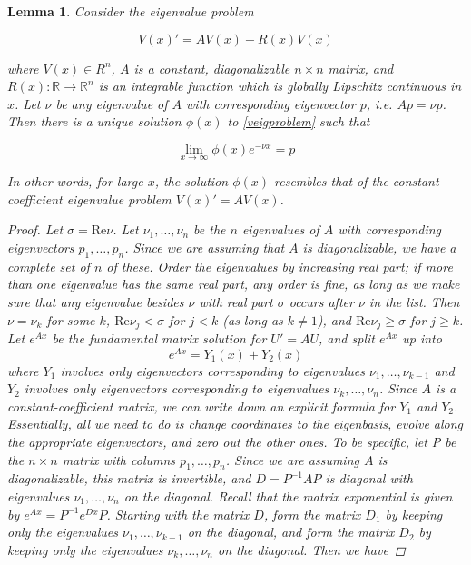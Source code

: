 \documentclass[12pt]{article}
\def\R{{\mathbb R}}
\newtheorem{lemma}{Lemma}
\begin{document}
\begin{lemma}Consider the eigenvalue problem

\begin{equation}\label{veigproblem}
V(x)' = AV(x) + R(x)V(x)
\end{equation}

where $V(x) \in R^n$, $A$ is a constant, diagonalizable $n \times n$ matrix, and $R(x): \R \rightarrow \R^n$ is an integrable function which is globally Lipschitz continuous in $x$. Let $\nu$ be any eigenvalue of $A$ with corresponding eigenvector $p$, i.e. $A p = \nu p$. Then there is a unique solution $\phi(x)$ to \eqref{veigproblem} such that 

\[
\lim_{x\rightarrow\infty} \phi(x) e^{-\nu x} = p
\]

In other words, for large $x$, the solution $\phi(x)$ resembles that of the constant coefficient eigenvalue problem $V(x)' = AV(x)$.

\begin{proof}
Let $\sigma = \text{Re} \nu$. Let $\nu_1, \dots, \nu_n$ be the $n$ eigenvalues of $A$ with corresponding eigenvectors $p_1, \dots, p_n$. Since we are assuming that $A$ is diagonalizable, we have a complete set of $n$ of these. Order the eigenvalues by increasing real part; if more than one eigenvalue has the same real part, any order is fine, as long as we make sure that any eigenvalue besides $\nu$ with real part $\sigma$ occurs after $\nu$ in the list. Then $\nu = \nu_k$ for some $k$, $\text{Re} \nu_j < \sigma$ for $j < k$ (as long as $k \neq 1$), and $\text{Re} \nu_j \geq \sigma$ for $j \geq k$. \\

Let $e^{Ax}$ be the fundamental matrix solution for $U' = A U$, and split $e^{Ax}$ up into
\[
e^{Ax} = Y_1(x) + Y_2(x)
\]
where $Y_1$ involves only eigenvectors corresponding to eigenvalues $\nu_1, \dots, \nu_{k-1}$ and $Y_2$ involves only eigenvectors corresponding to eigenvalues $\nu_{k}, \dots, \nu_n$. Since $A$ is a constant-coefficient matrix, we can write down an explicit formula for $Y_1$ and $Y_2$. Essentially, all we need to do is change coordinates to the eigenbasis, evolve along the appropriate eigenvectors, and zero out the other ones. To be specific, let P be the $n \times n$ matrix with columns $p_1, \dots, p_n$. Since we are assuming $A$ is diagonalizable, this matrix is invertible, and $D = P^{-1}AP$ is diagonal with eigenvalues $\nu_1, \dots, \nu_n$ on the diagonal. Recall that the matrix exponential is given by $e^{Ax} = P^{-1}e^{Dx}P$. Starting with the matrix $D$, form the matrix $D_1$ by keeping only the eigenvalues $\nu_1, \dots, \nu_{k-1}$ on the diagonal, and form the matrix $D_2$ by keeping only the eigenvalues $\nu_{k}, \dots, \nu_n$ on the diagonal. Then we have


\end{proof}
\end{lemma}
\end{document}
